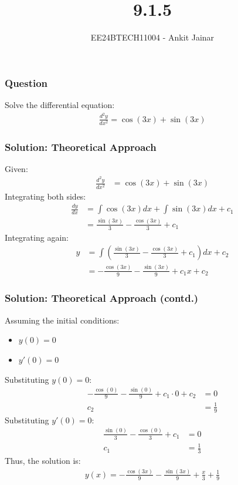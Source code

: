 \documentclass{beamer}
\title{9.1.5}
\author{EE24BTECH11004 - Ankit Jainar}
\date{}
\begin{document}
\frame{\titlepage}

\begin{frame}
\frametitle{Question}
Solve the differential equation:
\begin{align*}
    \frac{d^2y}{dx^2} = \cos(3x) + \sin(3x)
\end{align*}
\end{frame}

\begin{frame}
\frametitle{Solution: Theoretical Approach}
Given:
\begin{align}
    \frac{d^2y}{dx^2} &= \cos(3x) + \sin(3x)
\end{align}
Integrating both sides:
\begin{align}
    \frac{dy}{dx} &= \int \cos(3x) dx + \int \sin(3x) dx + c_1 \\
    &= \frac{\sin(3x)}{3} - \frac{\cos(3x)}{3} + c_1
\end{align}
\newline
Integrating again:
\begin{align}
    y &= \int \left( \frac{\sin(3x)}{3} - \frac{\cos(3x)}{3} + c_1 \right) dx + c_2 \\
    &= -\frac{\cos(3x)}{9} - \frac{\sin(3x)}{9} + c_1x + c_2
\end{align}
\end{frame}

\begin{frame}
\frametitle{Solution: Theoretical Approach (contd.)}
Assuming the initial conditions:
\begin{itemize}
    \item $y(0) = 0$
    \item $y'(0) = 0$
\end{itemize}
\newline
Substituting $y(0) = 0$:
\begin{align}
    -\frac{\cos(0)}{9} - \frac{\sin(0)}{9} + c_1 \cdot 0 + c_2 &= 0 \\
    c_2 &= \frac{1}{9}
\end{align}
Substituting $y'(0) = 0$:
\begin{align}
    \frac{\sin(0)}{3} - \frac{\cos(0)}{3} + c_1 &= 0 \\
    c_1 &= \frac{1}{3}
\end{align}
Thus, the solution is:
\begin{align}
    y(x) = -\frac{\cos(3x)}{9} - \frac{\sin(3x)}{9} + \frac{x}{3} + \frac{1}{9}
\end{align}
\end{frame}
\end{document}

